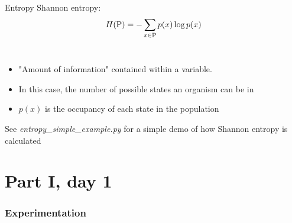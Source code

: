 \documentclass[handout,10pt,aspectratio=169]{beamer}
\begin{document}
\begin{frame}{Entropy}
		Shannon entropy:
$$
H({\rm P}) = -\sum_{x \in {\rm P}} p(x)\log p(x)
\label{eq:shannon-entropy-def}
$$
		\\
		\medskip
		\begin{itemize}
			\item "Amount of information" contained within
                          a variable.
			\item In this case, the number of possible states an organism can be in
			\item $p(x)$ is the occupancy of each state in the population
		\end{itemize}
		\bigskip
		See \emph{entropy\_simple\_example.py} for a simple
                demo of how Shannon entropy is calculated
\end{frame}

\part{Part I, day 1}

\section{Experimentation}
\end{document}
